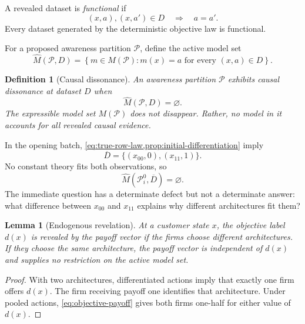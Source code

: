 \documentclass[11pt]{article}
\newtheorem{definition}[assumption]{Definition}
\newtheorem{lemma}[assumption]{Lemma}
\newcommand{\emptysetset}{\varnothing}
\begin{document}
A revealed dataset is \emph{functional} if
\begin{equation}
(x,a),(x,a')\in D
\quad\Longrightarrow\quad
a=a'.
\label{eq:functional-data}
\end{equation}
Every dataset generated by the deterministic objective law is functional.

For a proposed awareness partition $\mathcal P$, define the active model set
\begin{equation}
\widehat M(\mathcal P,D)
=
\left\{
m\in M(\mathcal P):
m(x)=a\text{ for every }(x,a)\in D
\right\}.
\label{eq:active-set}
\end{equation}

\begin{definition}[Causal dissonance]
An awareness partition $\mathcal P$ exhibits causal dissonance at dataset $D$
when
\[
\widehat M(\mathcal P,D)=\emptysetset.
\]
The expressible model set $M(\mathcal P)$ does not disappear.  Rather, no model
in it accounts for all revealed causal evidence.
\end{definition}

In the opening batch, \cref{eq:true-row-law,prop:initial-differentiation} imply
\begin{equation}
\overline D
=
\{(x_{00},0),(x_{11},1)\}.
\label{eq:discovery-data}
\end{equation}
No constant theory fits both observations, so
\begin{equation}
\widehat M(\mathcal P_i^0,\overline D)=\emptysetset.
\label{eq:initial-dissonance}
\end{equation}
The immediate question has a determinate defect but not a determinate answer:
what difference between $x_{00}$ and $x_{11}$ explains why different
architectures fit them?

\begin{lemma}[Endogenous revelation]
\label{lem:revelation}
At a customer state $x$, the objective label $d(x)$ is revealed by the payoff
vector if the firms choose different architectures.  If they choose the same
architecture, the payoff vector is independent of $d(x)$ and supplies no
restriction on the active model set.
\end{lemma}

\begin{proof}
With two architectures, differentiated actions imply that exactly one firm
offers $d(x)$.  The firm receiving payoff one identifies that architecture.
Under pooled actions, \cref{eq:objective-payoff} gives both firms one-half for
either value of $d(x)$.
\end{proof}
\end{document}
